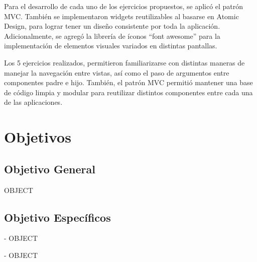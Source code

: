 \documentclass[12pt,letterpaper]{article}
\begin{document}
Para el desarrollo de cada uno de los ejercicios propuestos, se aplicó el patrón MVC. También se implementaron widgets reutilizables al basarse en Atomic Design, para lograr tener un diseño consistente por toda la aplicación. Adicionalmente, se agregó la librería de íconos “font awesome” para la implementación de elementos visuales variados en distintas pantallas. 

Los 5 ejercicios realizados, permitieron familiarizarse con distintas maneras de manejar la navegación entre vistas, así como el paso de argumentos entre componentes padre e hijo. También, el patrón MVC permitió mantener una base de código limpia y modular para reutilizar distintos componentes entre cada una de las aplicaciones.

\newpage


\renewcommand{\contentsname}{Índice de Contenidos}
{\setlength{\parskip}{0pt}
\tableofcontents
}

\vspace{1.0cm}

\renewcommand{\listfigurename}{Índice de Ilustraciones}
{\setlength{\cftbeforefigskip}{2pt}
\listoffigures
}

\newpage


\section{Objetivos}
\subsection{Objetivo General}
OBJECT

\subsection{Objetivo Específicos}
- OBJECT

- OBJECT
\end{document}

